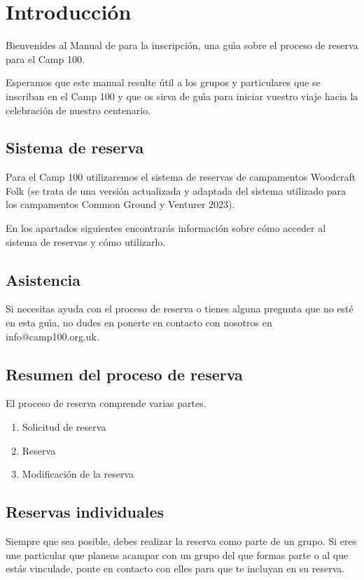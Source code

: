 \documentclass[a4paper, 11pt]{report}
\begin{document}
\makedocumenttitlepage

\tableofcontents

\chapter{Introducci\'on}
Bienvenides al Manual de para la inscripci\'on, una gu\'{\i}a sobre el proceso de reserva para el Camp 100.

Esperamos que este manual resulte \'util a los grupos y particulares que se inscriban en el Camp 100 y que os sirva de gu\'{\i}a para iniciar vuestro viaje hacia la celebraci\'on de nuestro centenario. 


\section{Sistema de reserva}
Para el Camp 100 utilizaremos el sistema de reservas de campamentos Woodcraft Folk (se trata de una versi\'on actualizada y adaptada del sistema utilizado para los campamentos Common Ground y Venturer 2023). 

En los apartados siguientes encontrar\'as informaci\'on sobre c\'omo acceder al sistema de reservas y c\'omo utilizarlo.


\section{Asistencia }
Si necesitas ayuda con el proceso de reserva o tienes alguna pregunta que no est\'e en esta gu\'{\i}a, no dudes en ponerte en contacto con nosotros en info@camp100.org.uk.

\section{Resumen del proceso de reserva}
El proceso de reserva comprende varias partes.
\begin{enumerate}
    \item Solicitud de reserva 
    \item Reserva 
    \item Modificaci\'on de la reserva 
\end{enumerate}

\section{Reservas individuales}
Siempre que sea posible, debes realizar la reserva como parte de un grupo. Si eres une particular que planeas acampar con un grupo del que formas parte o al que est\'as vinculade, ponte en contacto con elles para que te incluyan en su reserva.
\end{document}
